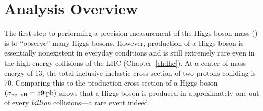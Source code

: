 \section{Analysis Overview}
\label{sec:analysis_overview}
The first step to performing a precision measurement of the Higgs boson mass (\mH) is to ``observe'' many Higgs bosons.
However, production of a Higgs boson is essentially nonexistent in everyday conditions and is still extremely rare even in the high-energy \pp collisions of the LHC (Chapter~\ref{ch:lhc}).
At a center-of-mass energy of 13\TeV, the total inclusive inelastic cross section of two protons colliding is 70\mb.
Comparing this to the production cross section of a Higgs boson $\left( \sigma_{\mathrm{p} \mathrm{p} \to \mathrm{H}} = 59\,\text{pb} \right)$
shows that a Higgs boson is produced in approximately one out of every \emph{billion} \pp collisions---a rare event indeed.

